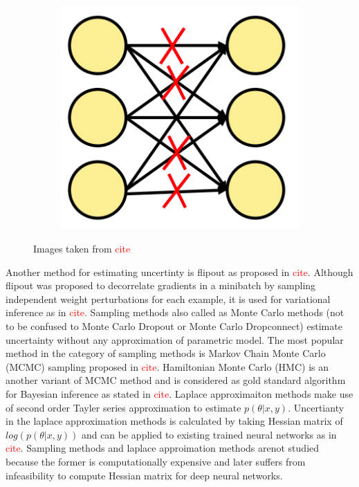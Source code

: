 \begin{figure}[htbp]
\begin{subfigure}{0.33\textwidth}
            \caption{}
            \label{fig:SOTA_Dropout}
        \end{subfigure}
        \begin{subfigure}{0.33\textwidth}
            \centering
            \includegraphics[scale=0.33]{images/DConnect_SOTA.png}
            \caption{}
            \label{fig:SOTA_Dconnect}
        \end{subfigure}
        \caption{Images taken from \textcolor{red}{cite}}
    \end{figure}

    Another method for estimating uncertinty is flipout as proposed in \textcolor{red}{cite}.
    Although flipout was proposed to decorrelate gradients in a minibatch by sampling independent weight perturbations for each example, it is used for variational inference as in \textcolor{red}{cite}.
    Sampling methods also called as Monte Carlo methods (not to be confused to Monte Carlo Dropout or Monte Carlo Dropconnect) estimate uncertainty without any approximation of parametric model.
    The most popular method in the category of sampling methods is Markov Chain Monte Carlo (MCMC) sampling proposed in \textcolor{red}{cite}.
    Hamiltonian Monte Carlo (HMC) is an another variant of MCMC method and is considered as gold standard algorithm for Bayesian inference as stated in \textcolor{red}{cite}.
    Laplace approximaiton methods make use of second order Tayler series approximation to estimate $p(\theta|x, y)$.
    Uncertianty in the laplace approximation methods is calculated by taking Hessian matrix of $log(p(\theta|x, y))$ and can be applied to existing trained neural networks as in \textcolor{red}{cite}.
    Sampling methods and laplace approimation methods arenot studied because the former is computationally expensive and later suffers from infeasibility to compute Hessian matrix for deep neural networks.
    
